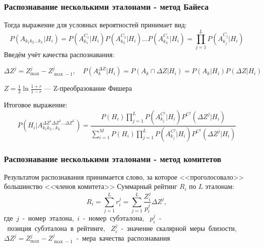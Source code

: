 \begin{frame}
\frametitle{\normalsize Распознавание несколькими эталонами - метод Байеса}
\footnotesize
\vfill
Тогда выражение для условных вероятностей принимает вид:
$$
P(A_{k_1 k_2 \dots k_L}|H_i) = P(A_{k_1}^{C_1}|H_i) P(A_{k_2}^{C_2}|H_i) \dots P(A_{k_L}^{C_L}|H_i) = \prod_{j=1}^{L} P(A_{k_j}^{C_j}|H_i)
$$
\vfill
Введём учёт качества распознавания: 

$$
\Delta Z^j = Z_{\max}^j - Z_{\max-1}^j,\quad
P(A_k^{\Delta Z}|H_i) = P(A_k \cap \Delta Z|H_i) = P(A_k|H_i) P(\Delta Z|H_i)
$$

$Z = \frac{1}{2} \ln \frac{1 + r}{1 - r}$ --- Z-преобразование Фишера

\vfill
Итоговое выражение:
$$
P(H_i|A_{k_1 k_2 \dots k_L}^{\Delta Z^1 \Delta Z^2 \dots \Delta Z^L}) = 
\frac{P(H_i) \prod_{j=1}^{L} P(A_{k_j}^{C^j}|H_i) P^{C^j}(\Delta Z^j|H_i)}{\sum_{i=1}^M P(H_i) \prod_{j=1}^{L} P(A_{k_j}^{C^j}|H_i) P^{C^j}(\Delta Z^j|H_i)}
$$
\vfill
\end{frame}

\begin{frame}
\frametitle{\small Распознавание несколькими эталонами - метод комитетов}
{\small Результатом распознавания принимается слово, за которое <<проголосовало>> большинство <<членов комитета>>}
\noindent\makebox[\linewidth]{\rule{0.9\paperwidth}{0.6pt}}
Суммарный рейтинг $R_i$ по $L$ эталонам:
$$
R_i = \sum_{j=1}^L r_i^j = \sum_{j=1}^L \frac{Z_i^j}{p_i^j} \Delta Z^j,
$$
где~$j$~-~номер~эталона,~$i$~-~номер~субэталона,
\phantom{где}~$p_i^j$~-~позиция~субэталона~в~рейтинге,
\phantom{где}~$Z_i^j$~-~значение~скалярной~меры~близости,
\phantom{где}~$\Delta Z^j = Z_{\max}^j - Z_{\max-1}^j$~-~мера~качества~распознавания
\end{frame}

